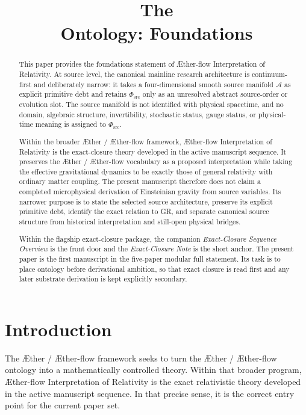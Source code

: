 \documentclass[11pt]{article}
\title{The \TheoryName{}\\[0.4em]
Ontology: Foundations}
\author{}
\date{}
\newcommand{\Aether}{\AE{}ther}
\newcommand{\Aflow}{\AE{}ther-flow}
\newcommand{\TheoryName}{\Aflow{} Interpretation of Relativity}
\newcommand{\TheoryProgram}{\Aether{} / \Aflow{} framework}
\newcommand{\Sub}{\mathcal{A}}
\newcommand{\PhiSrc}{\Phi_{\mathrm{src}}}
\begin{document}
\AetherFlowAPATitlePage

\begin{abstract}
This paper provides the foundations statement of \TheoryName{}. At source level, the canonical mainline research architecture is continuum-first and deliberately narrow: it takes a four-dimensional smooth source manifold \(\Sub\) as explicit primitive debt and retains \(\PhiSrc\) only as an unresolved abstract source-order or evolution slot. The source manifold is not identified with physical spacetime, and no domain, algebraic structure, invertibility, stochastic status, gauge status, or physical-time meaning is assigned to \(\PhiSrc\).

Within the broader \TheoryProgram{}, \TheoryName{} is the exact-closure theory developed in the active manuscript sequence. It preserves the \Aether{} / \Aflow{} vocabulary as a proposed interpretation while taking the effective gravitational dynamics to be exactly those of general relativity with ordinary matter coupling. The present manuscript therefore does not claim a completed microphysical derivation of Einsteinian gravity from source variables. Its narrower purpose is to state the selected source architecture, preserve its explicit primitive debt, identify the exact relation to GR, and separate canonical source structure from historical interpretation and still-open physical bridges.

Within the flagship exact-closure package, the companion \emph{Exact-Closure Sequence Overview} is the front door and the \emph{Exact-Closure Note} is the short anchor. The present paper is the first manuscript in the five-paper modular full statement. Its task is to place ontology before derivational ambition, so that exact closure is read first and any later substrate derivation is kept explicitly secondary.
%
\end{abstract}

\section{Introduction}

The \TheoryProgram{} seeks to turn the \Aether{} / \Aflow{} ontology into a mathematically controlled theory. Within that broader program, \TheoryName{} is the exact relativistic theory developed in the active manuscript sequence. In that precise sense, it is the correct entry point for the current paper set.
\end{document}
